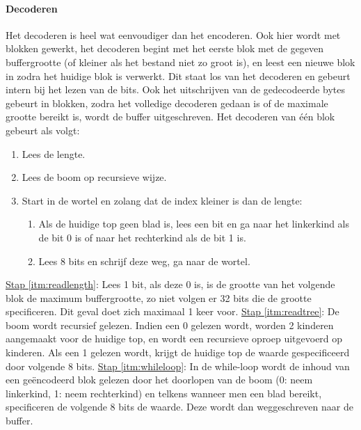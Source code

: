 \documentclass[11pt, a4paper]{article}
\begin{document}
\paragraph{Decoderen}
Het decoderen is heel wat eenvoudiger dan het encoderen. Ook hier wordt met blokken gewerkt, het decoderen begint met het eerste blok met de gegeven buffergrootte (of kleiner als het bestand niet zo groot is), en leest een nieuwe blok in zodra het huidige blok is verwerkt. Dit staat los van het decoderen en gebeurt intern bij het lezen van de bits. Ook het uitschrijven van de gedecodeerde bytes gebeurt in blokken, zodra het volledige decoderen gedaan is of de maximale grootte bereikt is, wordt de buffer uitgeschreven. Het decoderen van \'{e}\'{e}n blok gebeurt als volgt:
\begin{enumerate}
	\item \label{itm:readlength} Lees de lengte.
	\item \label{itm:readtree} Lees de boom op recursieve wijze. 
	\item \label{itm:whileloop} Start in de wortel en zolang dat de index kleiner is dan de lengte: 
	\begin{enumerate}
		\item \label{itm:readonebit} Als de huidige top geen blad is, lees een bit en ga naar het linkerkind als de bit 0 is of naar het rechterkind als de bit 1 is.
		\item \label{itm:readeightbit} Lees 8 bits en schrijf deze weg, ga naar de wortel.
	\end{enumerate}
\end{enumerate}	
\underline{Stap \ref{itm:readlength}}: 
Lees 1 bit, als deze 0 is, is de grootte van het volgende blok de maximum buffergrootte, zo niet volgen er 32 bits die de grootte specificeren. Dit geval doet zich maximaal 1 keer voor. 
\newline\underline{Stap \ref{itm:readtree}}:
De boom wordt recursief gelezen. Indien een 0 gelezen wordt, worden 2 kinderen aangemaakt voor de huidige top, en wordt een recursieve oproep uitgevoerd op kinderen. Als een 1 gelezen wordt, krijgt de huidige top de waarde gespecificeerd door volgende 8 bits. 
\newline\underline{Stap \ref{itm:whileloop}}:
In de while-loop wordt de inhoud van een ge\"{e}ncodeerd blok gelezen door het doorlopen van de boom (0: neem linkerkind, 1: neem rechterkind) en telkens wanneer men een blad bereikt, specificeren de volgende 8 bits de waarde. Deze wordt dan weggeschreven naar de buffer. 
\end{document}
